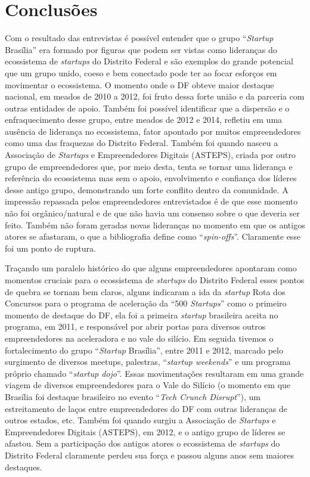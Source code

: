 \chapter[Conclusões]{Conclusões}
\label{cap-conclusoes}

Com o resultado das entrevistas é possível entender que o grupo ``\textit{Startup} Brasília'' era formado por figuras que podem ser vistas como lideranças do ecossistema de \textit{startups} do Distrito Federal e são exemplos do grande potencial que um grupo unido, coeso e bem conectado pode ter ao focar esforços em movimentar o ecossistema. O momento onde o DF obteve maior destaque nacional, em meados de 2010 a 2012, foi fruto dessa forte união e da parceria com outras entidades de apoio. Também foi possível identificar que a dispersão e o enfraquecimento desse grupo, entre meados de 2012 e 2014, refletiu em uma ausência de liderança no ecossistema, fator apontado por muitos empreendedores como uma das fraquezas do Distrito Federal. Também foi quando nasceu a Associação de \textit{Startups} e Empreendedores Digitais (ASTEPS), criada por outro grupo de empreendedores que, por meio desta, tenta se tornar uma liderança e referência do ecossistema mas sem o apoio, envolvimento e confiança dos líderes desse antigo grupo, demonstrando um forte conflito dentro da comunidade. A impressão repassada pelos empreendedores entrevistados é de que esse momento não foi orgânico/natural e de que não havia um consenso sobre o que deveria ser feito. Também não foram geradas novas lideranças no momento em que os antigos atores se afastaram, o que a bibliografia define como ``\textit{spin-offs}''. Claramente esse foi um ponto de ruptura.

Traçando um paralelo histórico do que alguns empreendedores apontaram como momentos cruciais para o ecossistema de \textit{startups} do Distrito Federal esses pontos de quebra se tornam bem claros, alguns indicaram a ida da \textit{startup} Rota dos Concursos para o programa de aceleração da ``500 \textit{Startups}'' como o primeiro momento de destaque do DF, ela foi a primeira \textit{startup} brasileira aceita no programa, em 2011, e responsável por abrir portas para diversos outros empreendedores na aceleradora e no vale do silício. Em seguida tivemos o fortalecimento do grupo ``\textit{Startup} Brasília'', entre 2011 e 2012, marcado pelo surgimento de diversos meetups, palestras, ``\textit{startup weekends}'' e um programa próprio chamado ``\textit{startup dojo}''. Essas movimentações resultaram em uma grande viagem de diversos empreendedores para o Vale do Silício (o momento em que Brasília foi destaque brasileiro no evento ``\textit{Tech Crunch Disrupt}''), um estreitamento de laços entre empreendedores do DF com outras lideranças de outros estados, etc. Também foi quando surgiu a Associação de \textit{Startups} e Empreendedores Digitais (ASTEPS), em 2012, e o antigo grupo de líderes se afastou. Sem a participação dos antigos atores o ecossistema de \textit{startups} do Distrito Federal claramente perdeu sua força e passou alguns anos sem maiores destaques.

